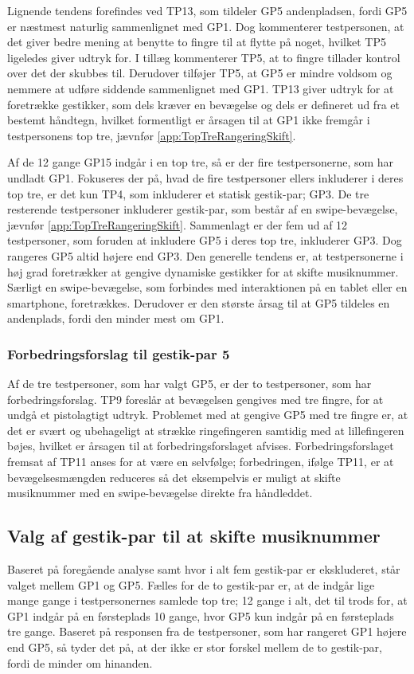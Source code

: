 Lignende tendens forefindes ved TP13, som tildeler GP5 andenpladsen, fordi GP5 er næstmest naturlig sammenlignet med GP1. Dog kommenterer testpersonen, at det giver bedre mening at benytte to fingre til at flytte på noget, hvilket TP5 ligeledes giver udtryk for. I tillæg kommenterer TP5, at to fingre tillader kontrol over det der skubbes til. Derudover tilføjer TP5, at GP5 er mindre voldsom og nemmere at udføre siddende sammenlignet med GP1. TP13 giver udtryk for at foretrække gestikker, som dels kræver en bevægelse og dels er defineret ud fra et bestemt håndtegn, hvilket formentligt er årsagen til at GP1 ikke fremgår i testpersonens top tre, jævnfør \autoref{app:TopTreRangeringSkift}.

Af de 12 gange GP15 indgår i en top tre, så er der fire testpersonerne, som har undladt GP1. Fokuseres der på, hvad de fire testpersoner ellers inkluderer i deres top tre, er det kun TP4, som inkluderer et statisk gestik-par; GP3. De tre resterende testpersoner inkluderer gestik-par, som består af en swipe-bevægelse, jævnfør \autoref{app:TopTreRangeringSkift}. Sammenlagt er der fem ud af 12 testpersoner, som foruden at inkludere GP5 i deres top tre, inkluderer GP3. Dog rangeres GP5 altid højere end GP3.\blankline 
%
Den generelle tendens er, at testpersonerne i høj grad foretrækker at gengive dynamiske gestikker for at skifte musiknummer. Særligt en swipe-bevægelse, som forbindes med interaktionen på en tablet eller en smartphone, foretrækkes. Derudover er den største årsag til at GP5 tildeles en andenplads, fordi den minder mest om GP1.   
%
\subsubsection{Forbedringsforslag til gestik-par 5}
\label{TestresultaterValgAfGestikkerForbedringGP5Skift}
%
Af de tre testpersoner, som har valgt GP5, er der to testpersoner, som har forbedringsforslag. TP9 foreslår at bevægelsen gengives med tre fingre, for at undgå et pistolagtigt udtryk. Problemet med at gengive GP5 med tre fingre er, at det er svært og ubehageligt at strække ringefingeren samtidig med at lillefingeren bøjes, hvilket er årsagen til at forbedringsforslaget afvises. Forbedringsforslaget fremsat af TP11 anses for at være en selvfølge; forbedringen, ifølge TP11, er at bevægelsesmængden reduceres så det eksempelvis er muligt at skifte musiknummer med en swipe-bevægelse direkte fra håndleddet. 
%
\subsection{Valg af gestik-par til at skifte musiknummer}
\label{TestresultaterValgAfGestikkerValgSkift}
%
Baseret på foregående analyse samt  hvor i alt fem gestik-par er ekskluderet, står valget mellem GP1 og GP5. Fælles for de to gestik-par er, at de indgår lige mange gange i testpersonernes samlede top tre; 12 gange i alt, det til trods for, at GP1 indgår på en førsteplads 10 gange, hvor GP5 kun indgår på en førsteplads tre gange. Baseret på responsen fra de testpersoner, som har rangeret GP1 højere end GP5, så tyder det på, at der ikke er stor forskel mellem de to gestik-par, fordi de minder om hinanden.

